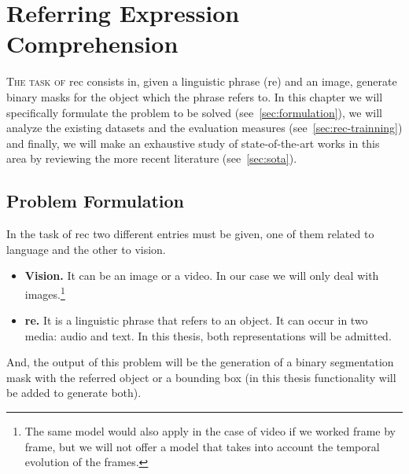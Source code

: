 

\chapter{Referring Expression Comprehension}%
\label{cha:rec}



\lettrine{T}{he task of} \gls{rec} consists in, given a linguistic phrase
(\gls{re}) and an image, generate binary masks for the object which the phrase
refers to. In this chapter we will specifically formulate the problem to be
solved (see\ \vref{sec:formulation}), we will analyze the existing datasets and
the evaluation measures (see\ \vref{sec:rec-trainning}) and finally, we will
make an exhaustive study of state-of-the-art works in this area by reviewing
the more recent literature (see\ \vref{sec:sota}).



\section{Problem Formulation}\label{sec:formulation}

In the task of \gls{rec} two different entries must be given, one of them
related to language and the other to vision.
\begin{itemize}
  \item \textbf{Vision.} It can be an image or a video. In our case we will
  only deal with images.\footnote{The same model would also apply in the case
    of video if we worked frame by frame, but we will not offer a model that
    takes into account the temporal evolution of the frames.}
  \item \textbf{\gls{re}.} It is a linguistic phrase that refers to an
  object. It can occur in two media: audio and text. In this thesis, both
  representations will be admitted.
\end{itemize}
And, the output of this problem will be the generation of a binary segmentation
mask with the referred object or a bounding box (in this
thesis functionality will be added to generate both).

